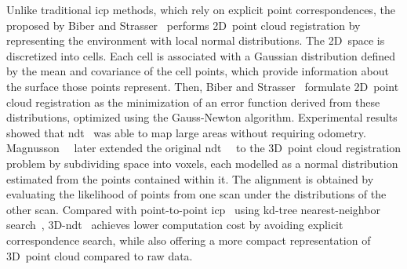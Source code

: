 Unlike traditional \gls{icp} methods, which rely on explicit point
correspondences, the 
proposed by Biber and Strasser~\cite{biber-strasser:iros:2003} performs
2D~point cloud registration by representing the environment
with local normal distributions. The 2D~space is discretized into cells.
Each cell is associated with a Gaussian distribution defined by
the mean and covariance of the cell points,
which provide information about the surface those points represent.
Then, Biber and Strasser~\cite{biber-strasser:iros:2003} formulate
2D~point cloud registration as the minimization of an error function
derived from these distributions, optimized using the Gauss-Newton algorithm.
Experimental results showed that \gls{ndt}~\cite{biber-strasser:iros:2003} was
able to map large areas without requiring odometry.
Magnusson~\etal~\cite{magnusson:jfr:2007} later extended the original
\gls{ndt}~~\cite{biber-strasser:iros:2003} to the
3D~point cloud registration problem by subdividing space into voxels,
each modelled as a normal distribution estimated from
the points contained within it. The alignment is obtained by
evaluating the likelihood of points from one scan under
the distributions of the other scan.
Compared with point-to-point \gls{icp}~\cite{besl-mckay:tpami:1992} using
kd-tree nearest-neighbor search~\cite{bentley:cacm:1975},
3D-\gls{ndt}~\cite{magnusson:jfr:2007} achieves
lower computation cost by avoiding explicit correspondence search,
while also offering a more compact representation of 3D~point cloud
compared to raw data.

